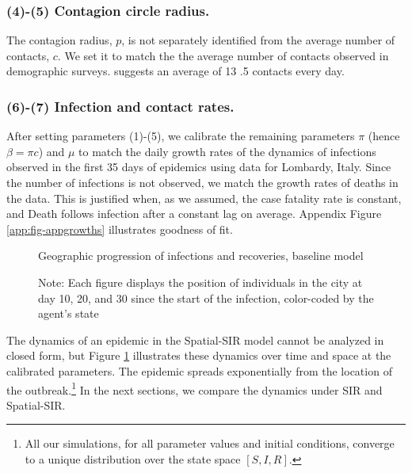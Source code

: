 \documentclass[english,11pt]{article}
\begin{document}
	\subsubsection*{(4)-(5) Contagion circle radius.} The contagion radius, $p$, is not separately identified from the average number of contacts, $c$. We set it to match the 
	the average number of contacts observed in demographic surveys. \citet{Mossong_2008} suggests an average of  13 .5 contacts every day. 

	 \subsubsection*{(6)-(7) Infection and contact rates.} 
	After setting parameters (1)-(5), we calibrate the remaining parameters $\pi$ (hence $\beta= \pi c$) and $\mu$ to match the daily growth rates of the dynamics of infections observed in the first 35 days of epidemics using data for Lombardy, Italy. Since the number of infections is not observed, we match the growth rates of deaths in the data. This is justified when, as we assumed, the case fatality rate is constant, and Death follows infection after a constant lag on average. Appendix Figure \ref{app:fig-appgrowths} illustrates goodness of fit.   


\begin{figure}
    
    \caption{Geographic progression of infections and recoveries, baseline model}

   \label{fig:geo}
   \caption*{\normalfont\footnotesize Note: Each figure displays the position of individuals in the city at day 10, 20, and 30 since the start of the infection, color-coded by the agent's state}
\end{figure}


The dynamics of an epidemic in the Spatial-SIR model cannot be analyzed in closed form, but Figure \ref{fig:geo} illustrates these dynamics over time and space at the calibrated parameters. The epidemic spreads exponentially from the location of the outbreak.\footnote{All our simulations, for all parameter values and initial conditions, converge to a unique distribution over the state space $ \left[S,I,R \right] $.
} In the next sections, we compare the dynamics under SIR and Spatial-SIR.   
\end{document}
